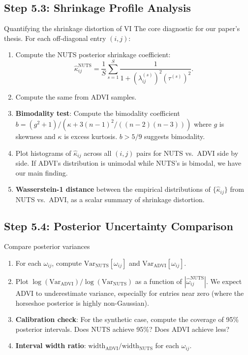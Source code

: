 \documentclass[11pt,a4paper]{article}
\begin{document}
\subsection{Step 5.3: Shrinkage Profile Analysis}

\begin{mathbox}{Quantifying the shrinkage distortion of VI}
The core diagnostic for our paper's thesis. For each off-diagonal entry $(i,j)$:
\begin{enumerate}
  \item Compute the NUTS posterior shrinkage coefficient:
  \begin{equation}
    \hat\kappa_{ij}^{\text{NUTS}} = \frac{1}{S}\sum_{s=1}^S \frac{1}{1 + (\lambda_{ij}^{(s)})^2 (\tau^{(s)})^2}.
  \end{equation}
  \item Compute the same from ADVI samples.
  \item \textbf{Bimodality test}: Compute the bimodality coefficient $b = (g^2 + 1) / (\kappa + 3(n-1)^2/((n-2)(n-3)))$ where $g$ is skewness and $\kappa$ is excess kurtosis. $b > 5/9$ suggests bimodality.
  \item Plot histograms of $\hat\kappa_{ij}$ across all $(i,j)$ pairs for NUTS vs.\ ADVI side by side. If ADVI's distribution is unimodal while NUTS's is bimodal, we have our main finding.
  \item \textbf{Wasserstein-1 distance} between the empirical distributions of $\{\hat\kappa_{ij}\}$ from NUTS vs.\ ADVI, as a scalar summary of shrinkage distortion.
\end{enumerate}
\end{mathbox}

\subsection{Step 5.4: Posterior Uncertainty Comparison}

\begin{action}{Compare posterior variances}
\begin{enumerate}
  \item For each $\omega_{ij}$, compute $\text{Var}_{\text{NUTS}}[\omega_{ij}]$ and $\text{Var}_{\text{ADVI}}[\omega_{ij}]$.
  \item Plot $\log(\text{Var}_{\text{ADVI}}) / \log(\text{Var}_{\text{NUTS}})$ as a function of $|\hat\omega_{ij}^{\text{NUTS}}|$. We expect ADVI to underestimate variance, especially for entries near zero (where the horseshoe posterior is highly non-Gaussian).
  \item \textbf{Calibration check}: For the synthetic case, compute the coverage of 95\% posterior intervals. Does NUTS achieve 95\%? Does ADVI achieve less?
  \item \textbf{Interval width ratio}: $\text{width}_{\text{ADVI}} / \text{width}_{\text{NUTS}}$ for each $\omega_{ij}$.
\end{enumerate}
\end{action}
\end{document}
